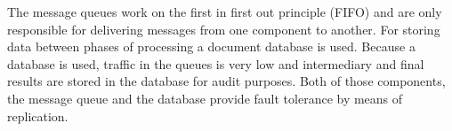 The message queues work on the first in first out principle (FIFO) and are only responsible for delivering messages from one component to another. For storing data between phases of processing a document database is used. 
Because a database is used, traffic in the queues is very low and intermediary and final results are stored in the database for audit purposes. Both of those components, the message queue and the database provide fault tolerance by means of replication.





